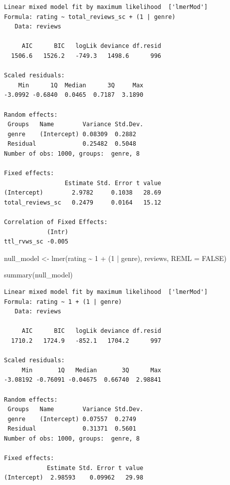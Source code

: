 \documentclass[
  letterpaper,
]{krantz}
\newenvironment{Shaded}{}{}
\newcommand{\AttributeTok}[1]{\textcolor[rgb]{0.49,0.56,0.16}{#1}}
\newcommand{\ConstantTok}[1]{\textcolor[rgb]{0.53,0.00,0.00}{#1}}
\newcommand{\DecValTok}[1]{\textcolor[rgb]{0.25,0.63,0.44}{#1}}
\newcommand{\FunctionTok}[1]{\textcolor[rgb]{0.02,0.16,0.49}{#1}}
\newcommand{\NormalTok}[1]{#1}
\newcommand{\OtherTok}[1]{\textcolor[rgb]{0.00,0.44,0.13}{#1}}
\newcommand{\SpecialCharTok}[1]{\textcolor[rgb]{0.25,0.44,0.63}{#1}}
\begin{document}
\begin{verbatim}
Linear mixed model fit by maximum likelihood  ['lmerMod']
Formula: rating ~ total_reviews_sc + (1 | genre)
   Data: reviews

     AIC      BIC   logLik deviance df.resid 
  1506.6   1526.2   -749.3   1498.6      996 

Scaled residuals: 
    Min      1Q  Median      3Q     Max 
-3.0992 -0.6840  0.0465  0.7187  3.1890 

Random effects:
 Groups   Name        Variance Std.Dev.
 genre    (Intercept) 0.08309  0.2882  
 Residual             0.25482  0.5048  
Number of obs: 1000, groups:  genre, 8

Fixed effects:
                 Estimate Std. Error t value
(Intercept)        2.9782     0.1038   28.69
total_reviews_sc   0.2479     0.0164   15.12

Correlation of Fixed Effects:
            (Intr)
ttl_rvws_sc -0.005
\end{verbatim}

\begin{Shaded}
\begin{Highlighting}[]
\NormalTok{null\_model }\OtherTok{\textless{}{-}} \FunctionTok{lmer}\NormalTok{(rating }\SpecialCharTok{\textasciitilde{}} \DecValTok{1} \SpecialCharTok{+}\NormalTok{ (}\DecValTok{1} \SpecialCharTok{|}\NormalTok{ genre), }
\NormalTok{                   reviews, }
                   \AttributeTok{REML =} \ConstantTok{FALSE}\NormalTok{)}

\FunctionTok{summary}\NormalTok{(null\_model)                  }
\end{Highlighting}
\end{Shaded}

\begin{verbatim}
Linear mixed model fit by maximum likelihood  ['lmerMod']
Formula: rating ~ 1 + (1 | genre)
   Data: reviews

     AIC      BIC   logLik deviance df.resid 
  1710.2   1724.9   -852.1   1704.2      997 

Scaled residuals: 
     Min       1Q   Median       3Q      Max 
-3.08192 -0.76091 -0.04675  0.66740  2.98841 

Random effects:
 Groups   Name        Variance Std.Dev.
 genre    (Intercept) 0.07557  0.2749  
 Residual             0.31371  0.5601  
Number of obs: 1000, groups:  genre, 8

Fixed effects:
            Estimate Std. Error t value
(Intercept)  2.98593    0.09962   29.98
\end{verbatim}
\end{document}
